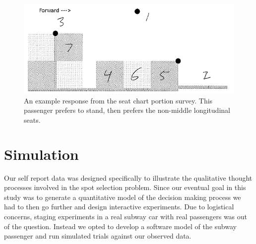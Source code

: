 \documentclass{acm_proc_article-sp}
\begin{document}
\begin{figure}[h!]
\includegraphics[width=\linewidth]{survey_response}
\caption{An example response from the seat chart portion survey. This passenger prefers to stand, then prefers the non-middle longitudinal seats.}
\end{figure}

\section{Simulation}
Our self report data was designed specifically to illustrate the qualitative thought processes involved in the spot selection problem. Since our eventual goal in this study was to generate a quantitative model of the decision making process we had to then go further and design interactive experiments. Due to logistical concerns, staging experiments in a real subway car with real passengers was out of the question. Instead we opted to develop a software model of the subway passenger and run simulated trials against our observed data.
\end{document}
